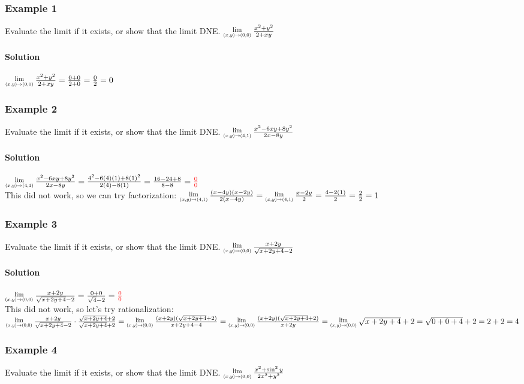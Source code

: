 \documentclass{article}
\newcommand{\Lim}[1]{\raisebox{0.5ex}{\scalebox{0.8}{$\displaystyle \lim_{#1}\;$}}}
\begin{document}
\subsubsection{Example 1}
Evaluate the limit if it exists, or show that the limit DNE. $\Lim{(x,y)\to(0,0)}\frac{x^2+y^2}{2+xy}$
\paragraph{Solution} $\Lim{(x,y)\to(0,0)}\frac{x^2+y^2}{2+xy}=\frac{0+0}{2+0}=\frac{0}{2}=0$

\subsubsection{Example 2}
Evaluate the limit if it exists, or show that the limit DNE. $\Lim{(x,y)\to(4,1)}\frac{x^2-6xy+8y^2}{2x-8y}$
\paragraph{Solution} $\Lim{(x,y)\to(4,1)}\frac{x^2-6xy+8y^2}{2x-8y}=\frac{4^2-6(4)(1)+8(1)^2}{2(4)-8(1)}=\frac{16-24+8}{8-8}=\textcolor{red}{\frac{0}{0}}$
\\This did not work, so we can try factorization: $\Lim{(x,y)\to(4,1)}\frac{(x-4y)(x-2y)}{2(x-4y)}=\Lim{(x,y)\to(4,1)}\frac{x-2y}{2}=\frac{4-2(1)}{2}=\frac{2}{2}=1$

\subsubsection{Example 3}
Evaluate the limit if it exists, or show that the limit DNE. $\Lim{(x,y)\to(0,0)}\frac{x+2y}{\sqrt{x+2y+4}-2}$
\paragraph{Solution} $\Lim{(x,y)\to(0,0)}\frac{x+2y}{\sqrt{x+2y+4}-2}=\frac{0+0}{\sqrt{4}-2}=\textcolor{red}{\frac{0}{0}}$
\\This did not work, so let's try rationalization: $\Lim{(x,y)\to(0,0)}\frac{x+2y}{\sqrt{x+2y+4}-2}\cdot\frac{\sqrt{x+2y+4}+2}{\sqrt{x+2y+4}+2}
=\Lim{(x,y)\to(0,0)}\frac{(x+2y)(\sqrt{x+2y+4}+2)}{x+2y+4-4}
\\=\Lim{(x,y)\to(0,0)}\frac{(x+2y)(\sqrt{x+2y+4}+2)}{x+2y}=\Lim{(x,y)\to(0,0)}\sqrt{x+2y+4}+2=\sqrt{0+0+4}+2=2+2=4$

\newpage\subsubsection{Example 4}
Evaluate the limit if it exists, or show that the limit DNE. $\Lim{(x,y)\to(0,0)}\frac{x^2+\sin^2y}{2x^2+y^2}$
\end{document}
